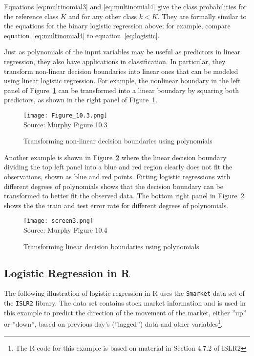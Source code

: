 Equations \ref{eq:multinomial3} and \ref{eq:multinomial4} give the class probabilities for the reference class $K$ and for any other class $k < K$. They are formally similar to the equations for the binary logistic regression above; for example, compare equation~\ref{eq:multinomial4} to equation~\ref{eq:logistic}.

Just as polynomials of the input variables may be useful as predictors in linear regression, they also have applications in classification. In particular, they transform non-linear decision boundaries into linear ones that can be modeled using linear logistic regression. For example, the nonlinear boundary in the left panel of Figure~\ref{fig:nonlinearboundary} can be transformed into a linear boundary by squaring both predictors, as shown in the right panel of Figure~\ref{fig:nonlinearboundary}.

\begin{figure}
\centering
\texttt{[image: Figure\_10.3.png]} \\
\scriptsize Source: Murphy Figure 10.3
\caption{Transforming non-linear decision boundaries using polynomials}
\label{fig:nonlinearboundary}
\end{figure}

Another example is shown in Figure~\ref{fig:nonlinearboundary2} where the linear decision boundary dividing the top left panel into a blue and red region clearly does not fit the observations, shown as blue and red points. Fitting logistic regressions with different degrees of polynomials shows that the decision boundary can be transformed to better fit the observed data. The bottom right panel in Figure~\ref{fig:nonlinearboundary2} shows the the train and test error rate for different degrees of polynomials. 

\begin{figure}
\centering
\texttt{[image: screen3.png]} \\
\scriptsize Source: Murphy Figure 10.4
\caption{Transforming linear decision boundaries using polynomials}
\label{fig:nonlinearboundary2}
\end{figure}

\subsection{Logistic Regression in R}

The following illustration of logistic regression in R uses the \texttt{Smarket} data set of the \texttt{ISLR2} library. The data set contains stock market information and is used in this example to predict the direction of the movement of the market, either ''up'' or ''down'', based on previous day's (''lagged'') data and other variables\footnote{The R code for this example is based on material in Section 4.7.2 of ISLR2}. 

